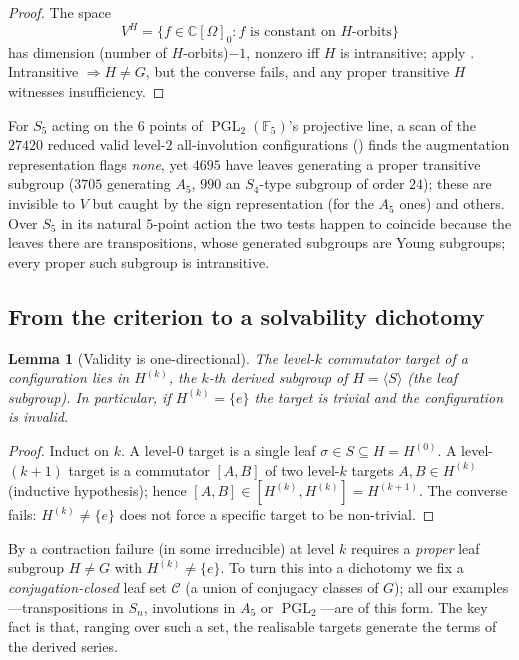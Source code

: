 \documentclass[11pt]{amsart}
\newtheorem{lemma}[lemma]{Lemma}
\theoremstyle{definition}
\theoremstyle{remark}
\theoremstyle{plain}
\theoremstyle{plain}
\numberwithin{equation}{section}
\DeclareMathOperator{\PGL}{PGL}
\newcommand{\F}{\mathbb{F}}
\newcommand{\C}{\mathbb{C}}
\begin{document}
\begin{proof}
The space
\[
V^{H}=\{f\in\C[\Omega]_0: f\text{ is constant on }H\text{-orbits}\}
\]
has dimension (number of $H$-orbits)$-1$, nonzero iff $H$ is intransitive; apply
.
Intransitive $\Rightarrow H\neq G$, but the converse fails, and any proper transitive
$H$ witnesses insufficiency.
\end{proof}

For $S_5$ acting on the $6$ points of $\PGL_2(\F_5)$'s
projective line, a scan of the $27420$ reduced valid level-$2$ all-involution configurations
() finds the augmentation representation flags \emph{none}, yet $4695$
have leaves generating a proper transitive subgroup ($3705$ generating $A_5$, $990$ an
$S_4$-type subgroup of order $24$); these are invisible to $V$ but caught by the sign
representation (for the $A_5$ ones) and others. Over $S_5$ in its natural $5$-point
action the two tests happen to coincide because the leaves there are transpositions,
whose generated subgroups are Young subgroups; every proper such subgroup is intransitive.

\subsection{From the criterion to a solvability dichotomy}

\begin{lemma}[Validity is one-directional]
\label{lem:valid}
The level-$k$ commutator target of a configuration lies in $H^{(k)}$, the $k$-th derived
subgroup of $H=\langle S\rangle$ (the leaf subgroup). In particular, if $H^{(k)}=\{e\}$ the
target is trivial and the configuration is \emph{invalid}.
\end{lemma}
\begin{proof}
Induct on $k$. A level-$0$ target is a single leaf $\sigma\in S\subseteq H=H^{(0)}$. A
level-$(k{+}1)$ target is a commutator $[A,B]$ of two level-$k$ targets $A,B\in H^{(k)}$
(inductive hypothesis); hence $[A,B]\in[H^{(k)},H^{(k)}]=H^{(k+1)}$. The converse fails:
$H^{(k)}\neq\{e\}$ does not force a specific target to be non-trivial.
\end{proof}

By  a contraction failure (in some irreducible) at level $k$ requires
a \emph{proper} leaf subgroup $H\neq G$ with $H^{(k)}\neq\{e\}$. To turn this into a
dichotomy we fix a \emph{conjugation-closed} leaf set $\mathcal{C}$ (a union of
conjugacy classes of $G$); all our examples---transpositions in $S_n$, involutions in
$A_5$ or $\PGL_2$---are of this form. The key fact is that, ranging over such a set, the
realisable targets generate the terms of the derived series.
\end{document}
